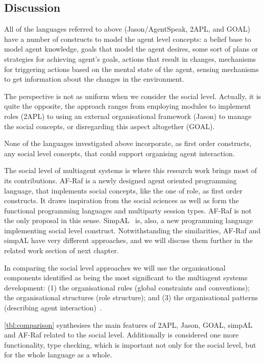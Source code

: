 \documentclass[a4paper,12pt,oneside,fleqn]{book} %
\begin{document}
\subsection{Discussion} %

All of the languages referred to above (Jason/AgentSpeak, 2APL, and GOAL)
have a number of constructs to model the agent level concepts: a belief
base to model agent knowledge, goals that model the agent desires, some
sort of plans or strategies for achieving agent's goals, actions that
result in changes, mechanisms for triggering actions based on the mental
state of the agent, sensing mechanisms to get information about the changes
in the environment.

The perspective is not as uniform when we consider the social level.
Actually, it is quite the opposite, the approach ranges from employing
modules to implement roles (2APL) to using an external organisational framework
(Jason) to manage the social concepts, or disregarding this aspect
altogether (GOAL).

None of the languages investigated above incorporate, as first order
constructs, any social level concepts, that could support organising agent
interaction.

The social level of multiagent systems is where this research
work brings most of its contributions. AF-Raf is a newly designed
agent oriented programming language, that implements social
concepts, like the one of role, as first order constructs. It draws
inspiration from the social sciences as well as form the functional
programming languages and multiparty session types. AF-Raf is not the only
proposal in this sense. SimpAL~\cite{DBLP:conf/oopsla/RicciS11} is, also, a new programming language
implementing social level construct. Notwithstanding the similarities,
AF-Raf and simpAL have very different approaches, and we will discuss them
further in the related work section of next chapter.

In comparing the social level approaches we will use the organisational
components identified as being the most significant to the multiagent
systems development: (1) the organisational rules (global constraints and
conventions); the organisational structures (role structure); and (3) the
organisational patterns (describing agent
interaction)~\cite{DBLP:conf/aose/ZambonelliJW00}.

\autoref{tbl:comparison} synthesises the main features of 2APL, Jason,
GOAL, simpAL and AF-Raf related to the social level. Additionally is
considered one more functionality, type checking, which is important not
only for the social level, but for the whole language as a whole.
\end{document}
